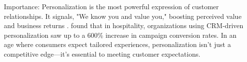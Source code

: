 Importance: Personalization is the most powerful expression of customer relationships. It signals, "We know you and value you," boosting perceived value and business returns \cite{othman2025}. \cite{nguyen2024} found that in hospitality, organizations using CRM-driven personalization saw up to a 600\% increase in campaign conversion rates. In an age where consumers expect tailored experiences, personalization isn't just a competitive edge—it's essential to meeting customer expectations.



